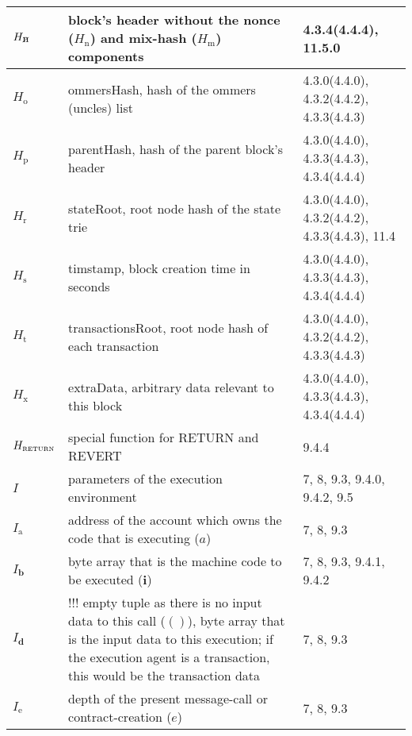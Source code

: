 \documentclass[9pt,oneside]{amsart}
\newcommand{\hcancel}[1]{%
    \tikz[baseline=(tocancel.base)]{
        \node[inner sep=0pt,outer sep=0pt] (tocancel) {#1};
        \draw[black] (tocancel.south west) -- (tocancel.north east);
    }%
}%
\newcommand{\reff}[1]{{\footnotesize #1}}
\begin{document}
\begin{longtabu}{X[1.2lm] X[3] X}
$H_{\hcancel{n}}$ &
block's header without the nonce ($H_{\mathrm{n}}$) and mix-hash ($H_{\mathrm{m}}$) components &
\reff{4.3.4(4.4.4), 11.5.0} \\\hline

$H_{\mathrm{o}}$ &
ommersHash, hash of the ommers (uncles) list &
\reff{4.3.0(4.4.0), 4.3.2(4.4.2), 4.3.3(4.4.3)} \\\hline

$H_{\mathrm{p}}$ &
parentHash, hash of the parent block's header &
\reff{4.3.0(4.4.0), 4.3.3(4.4.3), 4.3.4(4.4.4)} \\\hline

$H_{\mathrm{r}}$ &
stateRoot, root node hash of the state trie &
\reff{4.3.0(4.4.0), 4.3.2(4.4.2), 4.3.3(4.4.3), 11.4} \\\hline

$H_{\mathrm{s}}$ &
timstamp, block creation time in seconds &
\reff{4.3.0(4.4.0), 4.3.3(4.4.3), 4.3.4(4.4.4)} \\\hline

$H_{\mathrm{t}}$ &
transactionsRoot, root node hash of each transaction &
\reff{4.3.0(4.4.0), 4.3.2(4.4.2), 4.3.3(4.4.3)} \\\hline

$H_{\mathrm{x}}$ &
extraData, arbitrary data relevant to this block &
\reff{4.3.0(4.4.0), 4.3.3(4.4.3), 4.3.4(4.4.4)} \\\hline

$H_{\text{\tiny RETURN}}$ &
special function for {\small RETURN} and {\small REVERT} &
\reff{9.4.4} \\\hline

$I$ &
parameters of the execution environment &
\reff{7, 8, 9.3, 9.4.0, 9.4.2, 9.5} \\\hline

$I_{\mathrm{a}}$ &
address of the account which owns the code that is executing ($a$) &
\reff{7, 8, 9.3} \\\hline

$I_{\mathbf{b}}$ &
byte array that is the machine code to be executed ($\mathbf{i}$) &
\reff{7, 8, 9.3, 9.4.1, 9.4.2} \\\hline

$I_{\mathbf{d}}$ &
!!! empty tuple as there is no input data to this call ($()$), byte array that is the input data to this execution; if the execution agent is a transaction, this would be the transaction data &
\reff{7, 8, 9.3} \\\hline

$I_{\mathrm{e}}$ &
depth of the present message-call or contract-creation ($e$) &
\reff{7, 8, 9.3} \\\hline


\end{longtabu}
\end{document}
